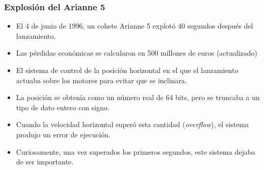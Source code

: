 \begin{frame}[fragile]
\frametitle{Explosión del Arianne 5}
\begin{itemize}[<+->]
\item El 4 de junio de 1996, un cohete Arianne 5 explotó 40 segundos después del lanzamiento.
\item Las pérdidas económicas se calcularon en 500 millones de euros (actualizado)
\item El sistema de control de la posición horizontal en el que el lanzamiento actuaba sobre los motores para evitar que se inclinara.
\item La posición se obtenía como un número real de 64 bits, pero se truncaba a un tipo de dato entero con signo.
\item Cuando la velocidad horizontal superó esta cantidad (\emph{overflow}), el sistema produjo un error de ejecución.
\item Curiosamente, una vez superados los primeros segundos, este sistema dejaba de ser importante.
\end{itemize}
\end{frame}
